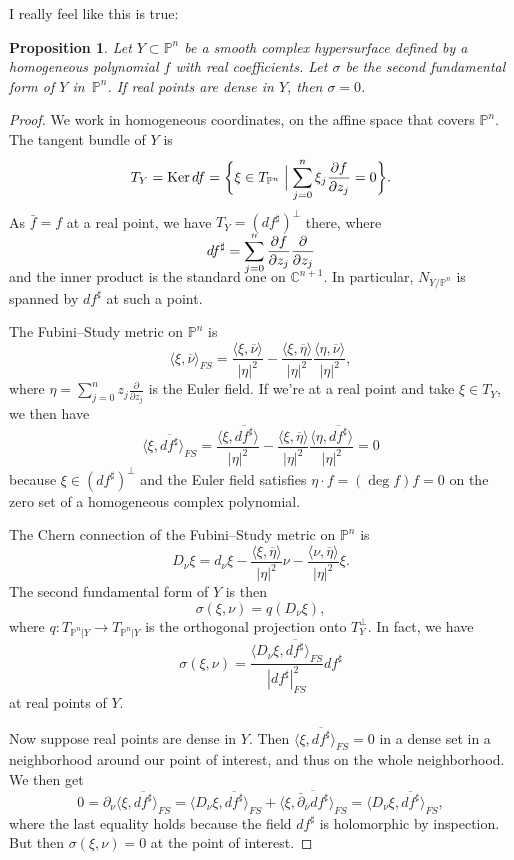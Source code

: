 \documentclass[11pt]{amsart}
\newtheorem{prop}[theo]{Proposition}
\theoremstyle{definition}
\newcommand{\kk}[1]{\mathbb{#1}}
\def\ov#1{\overline{#1}}
\DeclareMathOperator{\Ker}{Ker}
\begin{document}
I really feel like this is true:


\begin{prop}
Let $Y \subset \kk P^{n}$ be a smooth complex hypersurface defined by a homogeneous polynomial  $f$ with real coefficients.
Let $\sigma$ be the second fundamental form of $Y$ in~$\kk P^{n}$.
If real points are dense in $Y$, then $\sigma = 0$.
\end{prop}

\begin{proof}
We work in homogeneous coordinates, on the affine space that covers $\kk P^{n}$.
The tangent bundle of $Y$ is
\[
  T_{Y} = \Ker df
  = \biggl\{
  \xi \in T_{\kk P^{n}}
  \Bigm| \sum_{j=0}^{n} \xi_{j} \frac{\partial f}{\partial z_{j}} = 0
  \biggr\}.
\]
As $\bar f = f$ at a real point, we have $T_{Y} = (df^{\sharp})^{\perp}$ there,
where
$$
df^{\sharp} =
\smash{\sum_{j=0}^{n} \frac{\partial f}{\partial z_{j}} \frac{\partial}{\partial z_{j}}}
$$
and the inner product is the standard one on $\kk C^{n+1}$.
In particular, $N_{Y/\kk P^{n}}$ is spanned by $df^{\sharp}$ at such a point.

The Fubini--Study metric on $\kk P^{n}$ is
\[
  \langle \xi, \ov\nu \rangle_{FS}
  = \frac{\langle \xi, \ov\nu \rangle}{|\eta|^{2}}
  - \frac{\langle \xi, \ov\eta \rangle}{|\eta|^{2}}
  \frac{\langle \eta, \ov\nu \rangle}{|\eta|^{2}},
\]
where $\eta = \sum_{j=0}^{n} z_{j} \frac{\partial}{\partial z_{j}}$ is the Euler field.
If we're at a real point and take $\xi \in T_{Y}$, we then have
\[
  \langle \xi, \ov{df^{\sharp}} \rangle_{FS}
  = \frac{\langle \xi, \ov{df^{\sharp}} \rangle}{|\eta|^{2}}
  - \frac{\langle \xi, \ov\eta \rangle}{|\eta|^{2}}
  \frac{\langle \eta, \ov{df^{\sharp}} \rangle}{|\eta|^{2}}
  = 0
\]
because $\xi \in (df^{\sharp})^{\perp}$ and the Euler field satisfies $\eta \cdot f = (\deg f) f = 0$ on the zero set of a homogeneous complex polynomial.

The Chern connection of the Fubini--Study metric on $\kk P^{n}$ is
\[
  D_{\nu} \xi = d_{\nu}\xi
  - \frac{\langle \xi, \ov\eta\rangle}{|\eta|^{2}} \nu
  - \frac{\langle \nu, \ov\eta\rangle}{|\eta|^{2}} \xi.
\]
The second fundamental form of $Y$ is then
\[
  \sigma(\xi, \nu)
  = q(D_{\nu}\xi),
\]
where $q : T_{\kk P^{n}|Y} \to T_{\kk P^{n}|Y}$ is the orthogonal projection onto $T_{Y}^{\perp}$.
In fact, we have
\[
  \sigma(\xi, \nu)
  = \frac{\langle D_{\nu} \xi, \ov{df^{\sharp}} \rangle_{FS}}{|df^{\sharp}|_{FS}^{2}} df^{\sharp}
\]
at real points of $Y$.

Now suppose real points are dense in $Y$.
Then $\langle \xi, \ov{df^{\sharp}} \rangle_{FS} = 0$ in a dense set in a neighborhood around our point of interest, and thus on the whole neighborhood.
We then get
\[
  0 = \partial_{\nu} \langle \xi, \ov{df^{\sharp}} \rangle_{FS}
  = \langle D_{\nu}\xi,  \ov{df^{\sharp}} \rangle_{FS}
  + \langle \xi,  \ov{\bar\partial_{\ov\nu}df^{\sharp}} \rangle_{FS}
  = \langle D_{\nu}\xi,  \ov{df^{\sharp}} \rangle_{FS},
\]
where the last equality holds because the field $df^{\sharp}$ is holomorphic by inspection.
But then $\sigma(\xi, \nu) = 0$ at the point of interest.
\end{proof}
\end{document}
